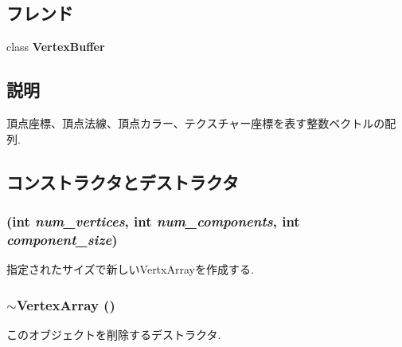 \subsection*{フレンド}
\begin{CompactItemize}
\item 
\hypertarget{classm3g_1_1VertexArray_9ef9a3db41cb54690169922706e1d3c5}{
class \textbf{VertexBuffer}}
\label{classm3g_1_1VertexArray_9ef9a3db41cb54690169922706e1d3c5}

\end{CompactItemize}


\subsection{説明}
頂点座標、頂点法線、頂点カラー、テクスチャー座標を表す整数ベクトルの配列. 

\subsection{コンストラクタとデストラクタ}
\hypertarget{classm3g_1_1VertexArray_5f38e30d23b5dc34b223e749e8afd0d0}{
\subsubsection[{VertexArray}]{ (int {\em num\_\-vertices}, \/  int {\em num\_\-components}, \/  int {\em component\_\-size})}}
\label{classm3g_1_1VertexArray_5f38e30d23b5dc34b223e749e8afd0d0}


指定されたサイズで新しいVertxArrayを作成する. \hypertarget{classm3g_1_1VertexArray_267fa63cb2f4216729437dc826415911}{
\subsubsection[{$\sim$VertexArray}]{\setlength{\rightskip}{0pt plus 5cm}$\sim${\bf VertexArray} ()}}
\label{classm3g_1_1VertexArray_267fa63cb2f4216729437dc826415911}


このオブジェクトを削除するデストラクタ. 

